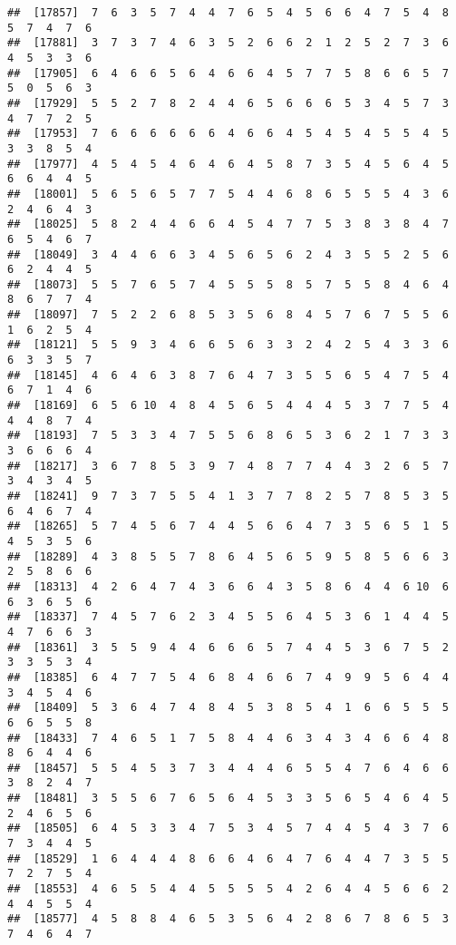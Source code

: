 \documentclass[
]{book}
\begin{document}
\begin{verbatim}
##  [17857]  7  6  3  5  7  4  4  7  6  5  4  5  6  6  4  7  5  4  8  5  7  4  7  6
##  [17881]  3  7  3  7  4  6  3  5  2  6  6  2  1  2  5  2  7  3  6  4  5  3  3  6
##  [17905]  6  4  6  6  5  6  4  6  6  4  5  7  7  5  8  6  6  5  7  5  0  5  6  3
##  [17929]  5  5  2  7  8  2  4  4  6  5  6  6  6  5  3  4  5  7  3  4  7  7  2  5
##  [17953]  7  6  6  6  6  6  6  4  6  6  4  5  4  5  4  5  5  4  5  3  3  8  5  4
##  [17977]  4  5  4  5  4  6  4  6  4  5  8  7  3  5  4  5  6  4  5  6  6  4  4  5
##  [18001]  5  6  5  6  5  7  7  5  4  4  6  8  6  5  5  5  4  3  6  2  4  6  4  3
##  [18025]  5  8  2  4  4  6  6  4  5  4  7  7  5  3  8  3  8  4  7  6  5  4  6  7
##  [18049]  3  4  4  6  6  3  4  5  6  5  6  2  4  3  5  5  2  5  6  6  2  4  4  5
##  [18073]  5  5  7  6  5  7  4  5  5  5  8  5  7  5  5  8  4  6  4  8  6  7  7  4
##  [18097]  7  5  2  2  6  8  5  3  5  6  8  4  5  7  6  7  5  5  6  1  6  2  5  4
##  [18121]  5  5  9  3  4  6  6  5  6  3  3  2  4  2  5  4  3  3  6  6  3  3  5  7
##  [18145]  4  6  4  6  3  8  7  6  4  7  3  5  5  6  5  4  7  5  4  6  7  1  4  6
##  [18169]  6  5  6 10  4  8  4  5  6  5  4  4  4  5  3  7  7  5  4  4  4  8  7  4
##  [18193]  7  5  3  3  4  7  5  5  6  8  6  5  3  6  2  1  7  3  3  3  6  6  6  4
##  [18217]  3  6  7  8  5  3  9  7  4  8  7  7  4  4  3  2  6  5  7  3  4  3  4  5
##  [18241]  9  7  3  7  5  5  4  1  3  7  7  8  2  5  7  8  5  3  5  6  4  6  7  4
##  [18265]  5  7  4  5  6  7  4  4  5  6  6  4  7  3  5  6  5  1  5  4  5  3  5  6
##  [18289]  4  3  8  5  5  7  8  6  4  5  6  5  9  5  8  5  6  6  3  2  5  8  6  6
##  [18313]  4  2  6  4  7  4  3  6  6  4  3  5  8  6  4  4  6 10  6  6  3  6  5  6
##  [18337]  7  4  5  7  6  2  3  4  5  5  6  4  5  3  6  1  4  4  5  4  7  6  6  3
##  [18361]  3  5  5  9  4  4  6  6  6  5  7  4  4  5  3  6  7  5  2  3  3  5  3  4
##  [18385]  6  4  7  7  5  4  6  8  4  6  6  7  4  9  9  5  6  4  4  3  4  5  4  6
##  [18409]  5  3  6  4  7  4  8  4  5  3  8  5  4  1  6  6  5  5  5  6  6  5  5  8
##  [18433]  7  4  6  5  1  7  5  8  4  4  6  3  4  3  4  6  6  4  8  8  6  4  4  6
##  [18457]  5  5  4  5  3  7  3  4  4  4  6  5  5  4  7  6  4  6  6  3  8  2  4  7
##  [18481]  3  5  5  6  7  6  5  6  4  5  3  3  5  6  5  4  6  4  5  2  4  6  5  6
##  [18505]  6  4  5  3  3  4  7  5  3  4  5  7  4  4  5  4  3  7  6  7  3  4  4  5
##  [18529]  1  6  4  4  4  8  6  6  4  6  4  7  6  4  4  7  3  5  5  7  2  7  5  4
##  [18553]  4  6  5  5  4  4  5  5  5  5  4  2  6  4  4  5  6  6  2  4  4  5  5  4
##  [18577]  4  5  8  8  4  6  5  3  5  6  4  2  8  6  7  8  6  5  3  7  4  6  4  7

\end{verbatim}
\end{document}
